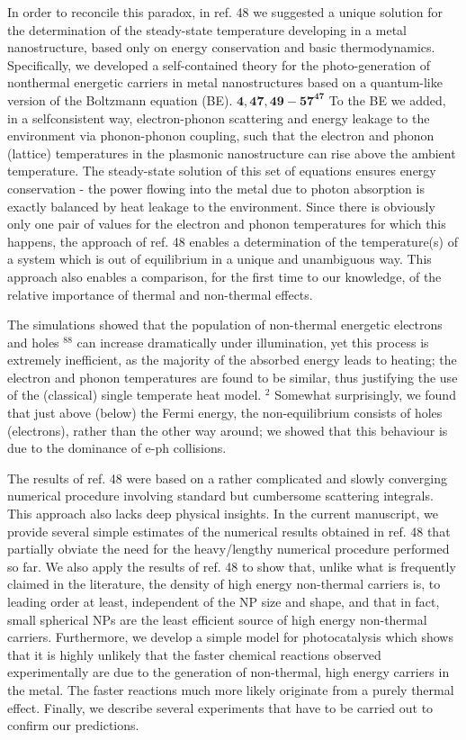 \documentclass[10pt]{article}
\begin{document}
In order to reconcile this paradox, in ref. 48 we suggested a unique solution for the determination of the steady-state temperature developing in a metal nanostructure, based only on energy conservation and basic thermodynamics. Specifically, we developed a self-contained theory for the photo-generation of nonthermal energetic carriers in metal nanostructures based on a quantum-like\\
version of the Boltzmann equation (BE). $\mathbf{4 , 4 7 , 4 9 - 5 7}^{\mathbf{4 7}}$ To the BE we added, in a selfconsistent way, electron-phonon scattering and energy leakage to the environment via phonon-phonon coupling, such that the electron and phonon (lattice) temperatures in the plasmonic nanostructure can rise above the ambient temperature. The steady-state solution of this set of equations ensures energy conservation - the power flowing into the metal due to photon absorption is exactly balanced by heat leakage to the environment. Since there is obviously only one pair of values for the electron and phonon temperatures for which this happens, the approach of ref. 48 enables a determination of the temperature(s) of a system which is out of equilibrium in a unique and unambiguous way. This approach also enables a comparison, for the first time to our knowledge, of the relative importance of thermal and non-thermal effects.

The simulations showed that the population of non-thermal energetic electrons and holes ${ }^{88}$ can increase dramatically under illumination, yet this process is extremely inefficient, as the majority of the absorbed energy leads to heating; the electron and phonon temperatures are found to be similar, thus justifying the use of the (classical) single temperate heat model. ${ }^{2}$ Somewhat surprisingly, we found that just above (below) the Fermi energy, the non-equilibrium consists of holes (electrons), rather than the other way around; we showed that this behaviour is due to the dominance of e-ph collisions.

The results of ref. 48 were based on a rather complicated and slowly converging numerical procedure involving standard but cumbersome scattering integrals. This approach also lacks deep physical insights. In the current manuscript, we provide several simple estimates of the numerical results obtained in ref. 48 that partially obviate the need for the heavy/lengthy numerical procedure performed so far. We also apply the results of ref. 48 to show that, unlike what is frequently claimed in the literature, the density of high energy non-thermal carriers is, to leading order at least, independent of the NP size and shape, and that in fact, small spherical NPs are the least efficient source of high energy non-thermal carriers. Furthermore, we develop a simple model for photocatalysis which shows that it is highly unlikely that the faster chemical reactions observed experimentally are due to the generation of non-thermal, high energy carriers in the metal. The faster reactions much more likely originate from a purely thermal effect. Finally, we describe several experiments that have to be carried out to confirm our predictions.
\end{document}

